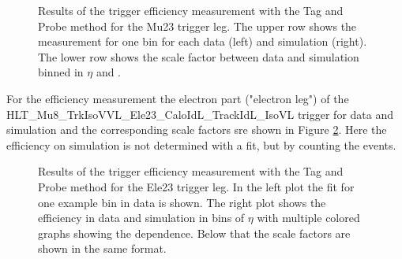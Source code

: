 \begin{figure}[htbp!]
\begin{center}
      \caption{Results of the trigger efficiency measurement with the Tag and Probe method for the Mu23 trigger leg. The upper row shows the measurement for one bin for each data (left) and simulation (right). The lower row shows 
       the scale factor between data and simulation binned in $\eta$ and \pt. }  
    \label{fig:TP_Mu23}
  \end{center}
\end{figure}

For the efficiency measurement the electron part ("electron leg") of the\\ HLT\_Mu8\_TrkIsoVVL\_Ele23\_CaloIdL\_TrackIdL\_IsoVL trigger for data and simulation and the corresponding scale factors sre shown in Figure \ref{fig:TP_Ele23}.
Here the efficiency on simulation is not determined with a fit, but by counting the events.

\begin{figure}[htbp!]
  \begin{center}
      \caption{Results of the trigger efficiency measurement with the Tag and Probe method for the Ele23 trigger leg. In the left plot the fit for one example bin in data is shown. The right plot shows the efficiency in data and simulation in bins of $\eta$ with multiple colored graphs showing the \pt dependence. Below that the scale factors are shown in the same format. }  
    \label{fig:TP_Ele23}
  \end{center}
\end{figure}


